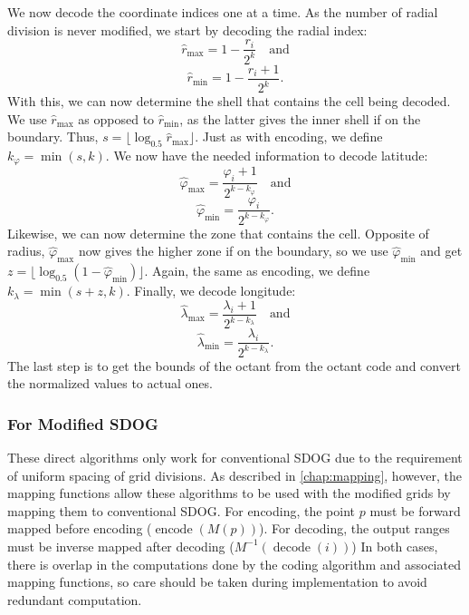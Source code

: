 We now decode the coordinate indices one at a time.
As the number of radial division is never modified, we start by decoding the radial index: 
%
\begin{equation*}
\hat{r}_\mathrm{max} = 1 - \frac{r_i}{2^k} \quad \text{and}
\end{equation*}
%
\begin{equation*}
\hat{r}_\mathrm{min} = 1 - \frac{r_i + 1}{2^k}.
\end{equation*}
%
With this, we can now determine the shell that contains the cell being decoded.
We use $\hat{r}_\mathrm{max}$ as opposed to $\hat{r}_\mathrm{min}$, as the latter gives the inner shell if on the boundary. Thus, $s = \lfloor \log_{0.5} \hat{r}_\mathrm{max} \rfloor$.
Just as with encoding, we define $k_\varphi = \min ( s, k )$.
We now have the needed information to decode latitude:
%
\begin{equation*}
\hat{\varphi}_\mathrm{max} = \frac{\varphi_i + 1}{2^{k - k_\varphi}} \quad \text{and}
\end{equation*}
%
\begin{equation*}
\hat{\varphi}_\mathrm{min} = \frac{\varphi_i}{2^{k - k_\varphi}}.
\end{equation*}
%
Likewise, we can now determine the zone that contains the cell.
Opposite of radius, $\hat{\varphi}_\mathrm{max}$ now gives the higher zone if on the boundary, so we use $\hat{\varphi}_\mathrm{min}$ and get $z = \lfloor \log_{0.5} ( 1 - \hat{\varphi}_\mathrm{min} ) \rfloor$.
Again, the same as encoding, we define $k_\lambda = \min ( s + z, k )$.
Finally, we decode longitude:
%
\begin{equation*}
\hat{\lambda}_\mathrm{max} = \frac{\lambda_i + 1}{2^{k - k_\lambda}} \quad \text{and}
\end{equation*}
%
\begin{equation*}
\hat{\lambda}_\mathrm{min} = \frac{\lambda_i}{2^{k - k_\lambda}}.
\end{equation*}
%
The last step is to get the bounds of the octant from the octant code and convert the normalized values to actual ones.


\subsubsection{For Modified SDOG}
These direct algorithms only work for conventional SDOG due to the requirement of uniform spacing of grid divisions.
As described in \cref{chap:mapping}, however, the mapping functions allow these algorithms to be used with the modified grids by mapping them to conventional SDOG.
For encoding, the point $p$ must be forward mapped before encoding ($\operatorname{encode}(M(p))$).
For decoding, the output ranges must be inverse mapped after decoding ($M^{-1}(\operatorname{decode}(i))$)
In both cases, there is overlap in the computations done by the coding algorithm and associated mapping functions, so care should be taken during implementation to avoid redundant computation.


